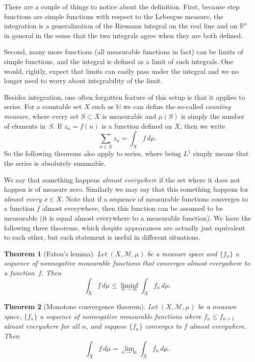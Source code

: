 \documentclass[12pt,openany]{book}
\newcommand{\R}{{\mathbb{R}}}
\newcommand{\N}{{\mathbb{N}}}
\newcommand{\sM}{{\mathscr{M}}}
\newcommand{\myindex}[1]{#1\index{#1}}
\theoremstyle{plain}
\newtheorem{thm}{Theorem}[section]
\theoremstyle{remark}
\theoremstyle{definition}
\theoremstyle{exercise}
\theoremstyle{example}
\begin{document}
There are a couple of things to notice about the definition.  First,
because step functions are simple functions with respect to the Lebesgue measure,
the integration is a generalization of the Riemann integral on the real line
and on $\R^n$ in general in the sense that the two integrals agree when they
are both defined.

Second, many more functions (all measurable functions in fact)
can be limits of simple functions, and the integral is defined as a limit of
such integrals.  One would, rightly, expect that limits can easily pass under
the integral and we no longer need to worry about integrability of the
limit.

Besides integration, one often forgotten feature of this setup is that it
applies to series.  For a countable set $X$ such as $\N$ we can define
the so-called \emph{\myindex{counting measure}}, where every set $S \subset
X$ is measurable and $\mu(S)$ is simply the number of elements in~$S$.
If $z_n = f(n)$ is a function defined on $X$, then we write
\begin{equation*}
\sum_{n \in X} z_n = \int_X f \, d\mu .
\end{equation*}
So the following theorems also apply to series, where being $L^1$ simply
means that the series is absolutely summable.

We say that something happens \emph{\myindex{almost everywhere}} if the set
where it does not happen is of measure zero.  Similarly we may say that this
something happens for \emph{almost every} $x \in X$.  Note that if a
sequence of measurable functions converges to a function $f$ almost
everywhere, then this function can be assumed to be measurable (it is equal
almost everywhere to a measurable function).  We have the following three
theorems, which despite appearances are actually just equivalent to each
other, but each statement is useful in different situations.

\begin{thm}[Fatou's lemma]
\pagebreak[2]
Let $(X,\sM,\mu)$ be a measure space and
$\{ f_n \}$ a sequence of nonnegative measurable functions that converges
almost everywhere to a function~$f$.  Then
\begin{equation*}
\int_X f \, d\mu \leq \liminf_{n\to \infty} \int_X f_n \, d\mu .
\end{equation*}
\end{thm}

\begin{thm}[Monotone convergence theorem]
\pagebreak[2]
Let $(X,\sM,\mu)$ be a measure space,
$\{ f_n \}$ a sequence of nonnegative measurable functions
where $f_n \leq f_{n+1}$ almost everywhere for all $n$, and suppose $\{f_n
\}$ converges to $f$ almost everywhere.  Then
\begin{equation*}
\int_X f \, d\mu = \lim_{n\to \infty} \int_X f_n \, d\mu .
\end{equation*}
\end{thm}
\end{document}
